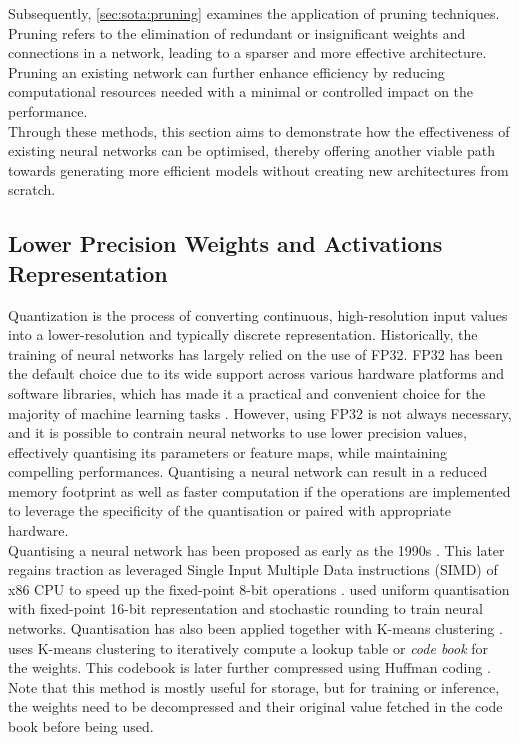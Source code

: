 Subsequently, \cref{sec:sota:pruning} examines the application of
pruning techniques. Pruning refers to the elimination of redundant or
insignificant weights and connections in a network, leading to a sparser and
more effective architecture. Pruning an existing network can further enhance
efficiency by reducing computational resources needed with a minimal or
controlled impact on the performance.\\

Through these methods, this section aims to demonstrate how the effectiveness of
existing neural networks can be optimised, thereby offering another viable path
towards generating more efficient models without creating new architectures from
scratch.\\

\subsection{Lower Precision Weights and Activations Representation}\label{sec:sota:quantisation}

Quantization is the process of converting continuous, high-resolution input
values into a lower-resolution and typically discrete representation.
Historically, the training of neural networks has largely relied on the use of
\ac{FP32}. FP32 has been the default choice due to its wide support across
various hardware platforms and software libraries, which has made it a practical
and convenient choice for the majority of machine learning tasks
\cite{sze2017efficient}. However, using \acl{FP32} is not always necessary, and
it is possible to contrain neural networks to use lower precision values,
effectively quantising its parameters or feature maps, while maintaining
compelling performances. Quantising a neural network can result in a reduced
memory footprint as well as faster computation if the operations are implemented
to leverage the specificity of the quantisation or paired with appropriate
hardware.\\

Quantising a neural network has been proposed as early as the 1990s
\cite{balzer1991weight,fiesler1990weight}. This later regains traction as
\citeauthor{37631} leveraged Single Input Multiple Data instructions (SIMD) of
x86 \ac{CPU} to speed up the fixed-point 8-bit operations \cite{37631}.
\citeauthor{gupta2015deep} used uniform quantisation with fixed-point 16-bit
representation and stochastic rounding to train neural networks. Quantisation
has also been applied together with K-means clustering
\cite{steinhaus1956division}. \cite{DBLP:journals/corr/HanMD15} uses K-means
clustering to iteratively compute a lookup table or \emph{code book} for the
weights. This codebook is later further compressed using Huffman coding
\cite{huffman1952method}. Note that this method is mostly useful for storage,
but for training or inference, the weights need to be decompressed and their
original value fetched in the code book before being used.\\

